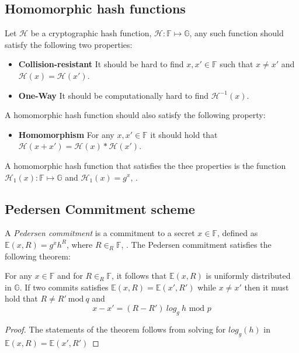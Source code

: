 \subsection*{Homomorphic hash functions}
Let $\mathcal{H}$ be a cryptographic hash function, $\mathcal{H}:\mathds{F}\mapsto \mathds{G}$, any such function should satisfy the following two properties:
\begin{itemize}
    \item \textbf{Collision-resistant} It should be hard to find $x,x'\in\mathds{F}$ such that $x\neq x'$ and $\mathcal{H}(x)=\mathcal{H}(x')$.
    \item \textbf{One-Way} It should be computationally hard to find $\mathcal{H}^{-1}(x)$.
\end{itemize}

A homomorphic hash function should also satisfy the following property:
\begin{itemize}
    \item \textbf{Homomorphism} For any $x,x'\in\mathds{F}$ it should hold that $\mathcal{H}(x + x') = \mathcal{H}(x)*\mathcal{H}(x')$.
\end{itemize}

A homomorphic hash function that satisfies the thee properties is the function $\mathcal{H}_1(x):\mathds{F}\mapsto\mathds{G}$ and $\mathcal{H}_1(x)= g^{x}$, \cite{HHF}. 



\subsection*{Pedersen Commitment scheme}
A \textit{Pedersen commitment} is a commitment to a secret $x\in\mathds{F}$, defined as $\mathds{E}(x,R)=g^xh^R$, where $R\in_R\mathds{F}$, \cite{pedersen}. The Pedersen commitment satisfies the following theorem:
\\
\begin{thm}
\label{thm:C=g^xh^R}
For any $x\in\mathds{F}$ and for $R\in_R\mathds{F}$, it follows that   $\mathds{E}(x,R)$ is uniformly distributed in $\mathds{G}$. If two commits satisfies $\mathds{E}(x,R)=\mathds{E}(x',R')$  while $x\neq x'$ then it must hold that $R\neq R' \:\text{mod}\:q$ and 
\begin{equation}
\label{eq:pedersen_binidng}
   x-x' =  (R-R')\:log_g\:h \text{ mod }p 
\end{equation}
\end{thm}
\begin{proof}
The statements of the theorem follows from solving for $log_g(h)$ in $\mathds{E}(x,R)=\mathds{E}(x',R')$ 
\end{proof}

